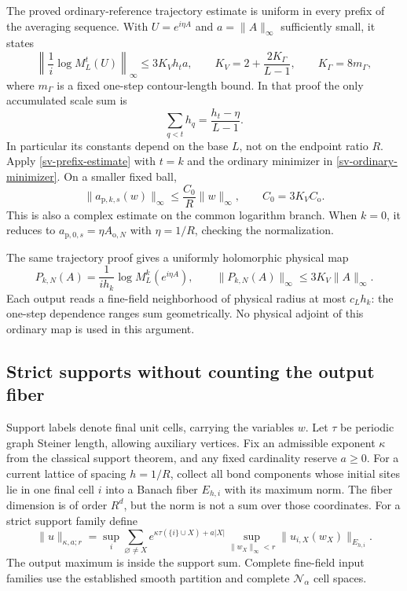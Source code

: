The proved ordinary-reference trajectory estimate is uniform in every
prefix of the averaging sequence. With $U=e^{i\eta A}$ and
$a=\|A\|_\infty$ sufficiently small, it states
\begin{equation}
 \left\|\frac1i\log M_L^t(U)\right\|_\infty
 \le 3K_Vh_ta,\qquad
 K_V=2+\frac{2K_\Gamma}{L-1},\qquad K_\Gamma=8m_\Gamma,
 \label{sv-prefix-estimate}
\end{equation}
where $m_\Gamma$ is a fixed one-step contour-length bound. In that proof
the only accumulated scale sum is
\begin{equation}
 \sum_{q<t}h_q=\frac{h_t-\eta}{L-1}.
 \label{sv-prefix-sum}
\end{equation}
In particular its constants depend on the base $L$, not on the endpoint
ratio $R$. Apply \eqref{sv-prefix-estimate} with $t=k$ and the ordinary
minimizer in \eqref{sv-ordinary-minimizer}. On a smaller fixed ball,
\begin{equation}
 \boxed{\quad
 \|a_{\mathrm p,k,s}(w)\|_\infty
       \le \frac{C_0}{R}\|w\|_\infty,\qquad
 C_0=3K_VC_{\mathrm o}.
 \quad}
 \label{sv-amplitude}
\end{equation}
This is also a complex estimate on the common logarithm branch. When
$k=0$, it reduces to $a_{\mathrm p,0,s}=\eta A_{\mathrm o,N}$ with
$\eta=1/R$, checking the normalization.

The same trajectory proof gives a uniformly holomorphic physical map
\begin{equation}
 P_{k,N}(A)=\frac1{ih_k}\log M_L^k(e^{i\eta A}),\qquad
 \|P_{k,N}(A)\|_\infty\le 3K_V\|A\|_\infty.
 \label{sv-physical-prefix-map}
\end{equation}
Each output reads a fine-field neighborhood of physical radius at most
$c_Lh_k$: the one-step dependence ranges sum geometrically. No physical
adjoint of this ordinary map is used in this argument.

\subsection{Strict supports without counting the output fiber}
\label{sv-support-section}

Support labels denote final unit cells, carrying the variables $w$.
Let $\tau$ be periodic graph Steiner length, allowing auxiliary vertices.
Fix an admissible exponent $\kappa$ from the classical support theorem,
and any fixed cardinality reserve $a\ge0$. For a current lattice of
spacing $h=1/R$, collect all bond components whose initial sites lie in
one final cell $i$ into a Banach fiber $E_{h,i}$ with its maximum norm.
The fiber dimension is of order $R^d$, but the norm is not a sum over
those coordinates. For a strict support family define
\begin{equation}
 \|u\|_{\kappa,a;r}
 =\sup_i\sum_{\varnothing\ne X}
 e^{\kappa\tau(\{i\}\cup X)+a|X|}
 \sup_{\|w_X\|_\infty<r}\|u_{i,X}(w_X)\|_{E_{h,i}}.
 \label{sv-family-norm}
\end{equation}
The output maximum is inside the support sum. Complete fine-field input
families use the established smooth partition and complete
$\mathcal N_\alpha$ cell spaces.

